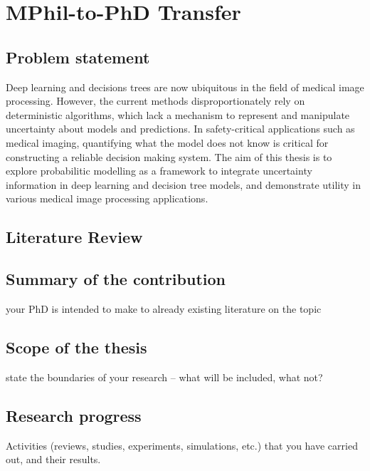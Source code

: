 \chapter{MPhil-to-PhD Transfer}
\label{chapter:mphiltransfer}

\section{Problem statement}
Deep learning and decisions trees are now ubiquitous in the field of medical image processing. However, the current methods disproportionately rely on deterministic algorithms, which lack a mechanism to represent and manipulate uncertainty about models and predictions. In safety-critical applications such as medical imaging, quantifying what the model does not know is critical for constructing a reliable decision making system. The aim of this thesis is to explore probabilitic modelling as a framework to integrate uncertainty information in deep learning and decision tree models, and demonstrate utility in various medical image processing applications. 


\section{Literature Review} 



\section{Summary of the contribution} 
your PhD is intended to make to already existing literature on the topic

\section{Scope of the thesis}
state the boundaries of your research – what will be included, what not?

\section{Research progress}
Activities (reviews, studies, experiments, simulations, etc.) that you have carried out, and their results. 

